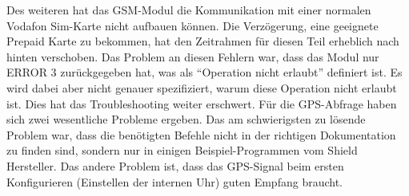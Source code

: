 Des weiteren hat das GSM-Modul die Kommunikation mit einer normalen Vodafon Sim-Karte nicht aufbauen können. Die Verzögerung, eine geeignete Prepaid Karte zu bekommen, hat den Zeitrahmen für diesen Teil erheblich nach hinten verschoben.
Das Problem an diesen Fehlern war, dass das Modul nur ERROR 3 zurückgegeben hat, was als “Operation nicht erlaubt” definiert ist. Es wird dabei aber nicht genauer spezifiziert, warum diese Operation nicht erlaubt ist. Dies hat das Troubleshooting weiter erschwert.
Für die GPS-Abfrage haben sich zwei wesentliche Probleme ergeben. Das am schwierigsten zu lösende Problem war, dass die benötigten Befehle nicht in der richtigen Dokumentation zu finden sind, sondern nur in einigen Beispiel-Programmen vom Shield Hersteller. Das andere Problem ist, dass das GPS-Signal beim ersten Konfigurieren (Einstellen der internen Uhr) guten Empfang braucht.

